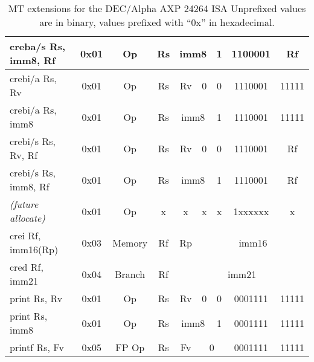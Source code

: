 \documentclass[a4paper,11pt]{article}
\begin{document}
\begin{table}
\begin{center}
{\begin{tabular}{|>{\ttfamily}l||c|c|c|c|c|c|c|c|}
creba/s Rs, imm8, Rf    & 0x01 & Op     & Rs & \multicolumn{2}{c|}{imm8} & 1 & 1100001 & Rf \\ \cline{5-6}
crebi/a Rs, Rv          & 0x01 & Op     & Rs &                    Rv & 0 & 0 & 1110001 & 11111 \\ \cline{5-6}
crebi/a Rs, imm8        & 0x01 & Op     & Rs & \multicolumn{2}{c|}{imm8} & 1 & 1110001 & 11111 \\ \cline{5-6}
crebi/s Rs, Rv, Rf      & 0x01 & Op     & Rs &                    Rv & 0 & 0 & 1110001 & Rf \\ \cline{5-6}
crebi/s Rs, imm8, Rf    & 0x01 & Op     & Rs & \multicolumn{2}{c|}{imm8} & 1 & 1110001 & Rf \\ \cline{5-6}
\hline \hline
\normalfont \emph{(future allocate)} & 0x01 & Op & x & x & x & x & 1xxxxxx & x \\
\hline\hline
crei  Rf, imm16(Rp)     & 0x03 & Memory & Rf & Rp & \multicolumn{4}{c|}{imm16} \\
\hline\hline
cred  Rf, imm21         & 0x04 & Branch & Rf & \multicolumn{5}{c|}{imm21} \\
\hline \hline
print Rs, Rv            & 0x01 & Op     & Rs &                    Rv & 0 & 0 & 0001111 & 11111 \\ \cline{5-6}
print Rs, imm8          & 0x01 & Op     & Rs & \multicolumn{2}{c|}{imm8} & 1 & 0001111 & 11111 \\ \cline{5-7}
printf Rs, Fv           & 0x05 & FP Op  & Rs & Fv & \multicolumn{2}{c|}{0} &  0001111  & 11111 \\ 
\hline
\end{tabular}
\caption{MT extensions for the DEC/Alpha AXP 24264 ISA \newline Unprefixed values are in binary, values prefixed with ``0x'' in hexadecimal.}
}\end{center}
\end{table}
\end{document}
